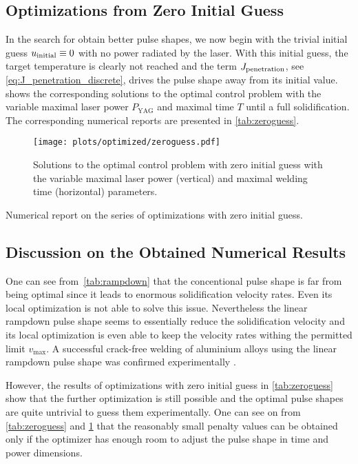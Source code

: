 \subsection{Optimizations from Zero Initial Guess}

In the search for obtain better pulse shapes, we now begin with the trivial initial guess $u_\textup{initial} \equiv 0$ with no power radiated by the laser. 
With this initial guess, the target temperature is clearly not reached and the term $J_\textup{penetration}$, see \eqref{eq:J_penetration_discrete}, drives the pulse shape away from its initial value.
 shows the corresponding solutions to the optimal control problem with the variable maximal laser power $P_\text{YAG}$ and maximal time $T$ until a full solidification.
The corresponding numerical reports are presented in \cref{tab:zeroguess}.

\begin{figure} 
	\centering
	\texttt{[image: plots/optimized/zeroguess.pdf]}
	\caption{Solutions to the optimal control problem with zero initial guess with the variable maximal laser power (vertical) and maximal welding time (horizontal) parameters.}
	\label{fig:zeroguess}
\end{figure}

\begin{table} 
	\centering
	
	\caption{Numerical report on the series of optimizations with zero initial guess.}
	\label{tab:zeroguess}
\end{table}


\subsection{Discussion on the Obtained Numerical Results}

One can see from~\cref{tab:rampdown} that the concentional pulse shape is far from being optimal since it leads to enormous solidification velocity rates. Even its local optimization is not able to solve this issue. Nevertheless the linear rampdown pulse shape seems to essentially reduce the solidification velocity and its local optimization is even able to keep the velocity rates withing the permitted limit $v_{\max}$. A successful crack-free welding of aluminium alloys using the linear rampdown pulse shape was confirmed experimentally .

However, the results of optimizations with zero initial guess in \cref{tab:zeroguess} show that the further optimization is still possible and the optimal pulse shapes are quite untrivial to guess them experimentally. One can see on from \cref{tab:zeroguess} and \cref{fig:zeroguess} that the reasonably small penalty values can be obtained only if the optimizer has enough room to adjust the pulse shape in time and power dimensions.

